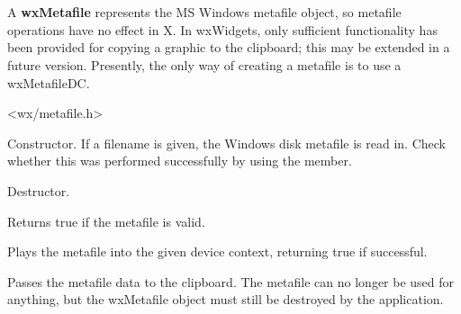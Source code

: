 \section{}\label{wxmetafile}

A {\bf wxMetafile} represents the MS Windows metafile object, so metafile
operations have no effect in X. In wxWidgets, only sufficient functionality
has been provided for copying a graphic to the clipboard; this may be extended
in a future version. Presently, the only way of creating a metafile
is to use a wxMetafileDC.




<wx/metafile.h>




\label{wxmetafilector}


Constructor. If a filename is given, the Windows disk metafile is
read in. Check whether this was performed successfully by
using the  member.

\label{wxmetafiledtor}


Destructor.

\label{wxmetafileisok}


Returns true if the metafile is valid.

\label{wxmetafileplay}


Plays the metafile into the given device context, returning
true if successful.

\label{wxmetafilesetclipboard}


Passes the metafile data to the clipboard. The metafile can no longer be
used for anything, but the wxMetafile object must still be destroyed by
the application.


